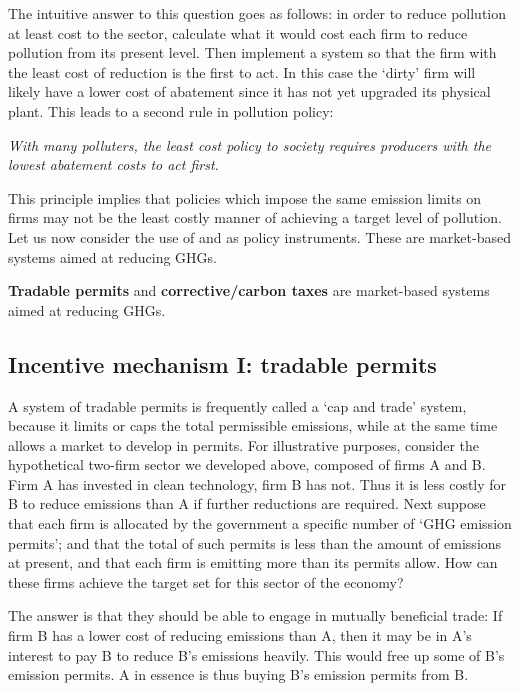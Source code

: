 The intuitive answer to this question goes as follows: in order to reduce pollution at least cost to the sector, calculate what it would cost each firm to reduce pollution from its present level. Then implement a system so that the firm with the least cost of reduction is the first to act. In this case the `dirty' firm will likely have a lower cost of abatement since it has not yet upgraded its physical plant. This leads to a second rule in pollution policy:

\textit{With many polluters, the least cost policy to society requires producers with the lowest abatement costs to act first.}

This principle implies that policies which impose the same emission limits on firms may not be the least costly manner of achieving a target level of pollution. Let us now consider the use of  and  as policy instruments. These are market-based systems aimed at reducing GHGs.

\begin{DefBox}
\textbf{Tradable permits} and \textbf{corrective/carbon taxes} are market-based systems aimed at reducing GHGs.
\end{DefBox}

\subsection*{Incentive mechanism I: tradable permits}

A system of tradable permits is frequently called a `cap and trade' system, because it limits or caps the total permissible emissions, while at the same time allows a market to develop in permits. For illustrative purposes, consider the hypothetical two-firm sector we developed above, composed of firms A and B. Firm A has invested in clean technology, firm B has not. Thus it is less costly for B to reduce emissions than A if further reductions are required. Next suppose that each firm is allocated by the government a specific number of `GHG emission permits'; and that the total of such permits is less than the amount of emissions at present, and that each firm is emitting more than its permits allow. How can these firms achieve the target set for this sector of the economy?

The answer is that they should be able to engage in mutually beneficial trade: If firm B has a lower cost of reducing emissions than A, then it may be in A's interest to pay B to reduce B's emissions heavily. This would free up some of B's emission permits. A in essence is thus buying B's emission permits from B. 

